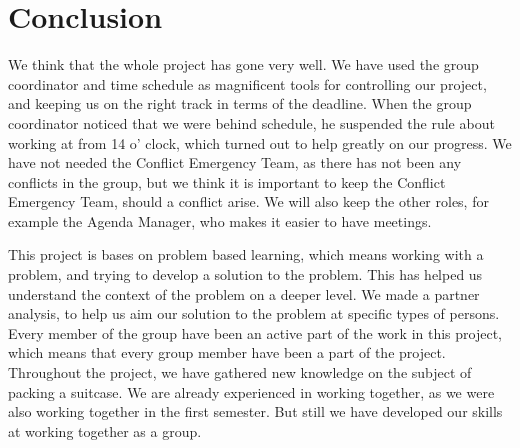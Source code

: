 \chapter{Conclusion}
We think that the whole project has gone very well. We have used the group coordinator and time schedule as magnificent tools for controlling our project, and keeping us on the right track in terms of the deadline. When the group coordinator noticed that we were behind schedule, he suspended the rule about working at from 14 o' clock, which turned out to help greatly on our progress. We have not needed the Conflict Emergency Team, as there has not been any conflicts in the group, but we think it is important to keep the Conflict Emergency Team, should a conflict arise. We will also keep the other roles, for example the Agenda Manager, who makes it easier to have meetings. 

This project is bases on problem based learning, which means working with a problem, and trying to develop a solution to the problem. This has helped us understand the context of the problem on a deeper level. We made a partner analysis, to help us aim our solution to the problem at specific types of persons. Every member of the group have been an active part of the work in this project, which means that every group member have been a part of the project. Throughout the project, we have gathered new knowledge on the subject of packing a suitcase. We are already experienced in working together, as we were also working together in the first semester. But still we have developed our skills at working together as a group. 